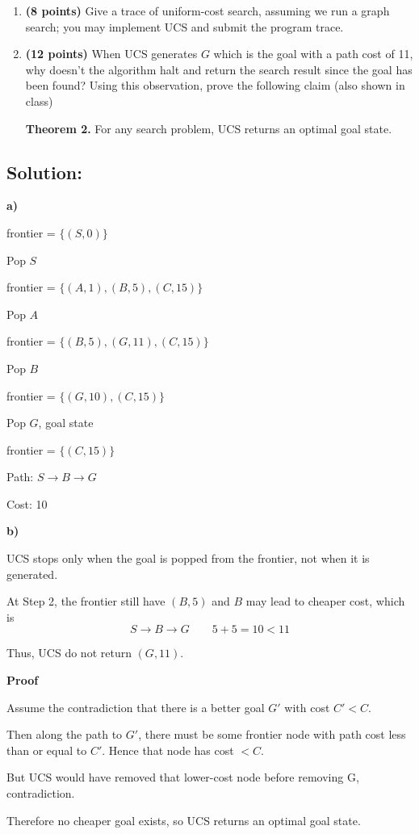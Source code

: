\documentclass[11pt]{article}
\begin{document}
\begin{enumerate}[leftmargin=*, label=\textbf{\arabic*.}]
\begin{enumerate}[label=(\alph*), leftmargin=2em]
    \item \textbf{(8 points)} Give a trace of uniform-cost search, assuming we run a graph search; you may implement UCS and submit the program trace.
    \item \textbf{(12 points)} When UCS generates $G$ which is the goal with a path cost of 11, why doesn't the algorithm halt and return the search result since the goal has been found? Using this observation, prove the following claim (also shown in class)

    \textbf{Theorem 2.} For any search problem, UCS returns an optimal goal state.
\end{enumerate}

\end{enumerate}

\subsection*{Solution:}

\textbf{a)}


frontier = $\{(S, 0)\}$


Pop $S$

frontier = $\{(A, 1), (B, 5), (C, 15)\}$


Pop $A$

frontier = $\{(B, 5), (G, 11), (C, 15)\}$


Pop $B$

frontier = $\{(G, 10), (C, 15)\}$


Pop $G$, goal state

frontier = $\{(C, 15)\}$


Path: $S \rightarrow B \rightarrow G$

Cost: 10

\textbf{b)}

UCS stops only when the goal is popped from the frontier, not when it is generated.

At Step 2, the frontier still have $(B, 5)$ and $B$ may lead to cheaper cost, which is 
\[S \rightarrow B \rightarrow G \qquad 5 + 5 = 10 < 11\]

Thus, UCS do not return $(G, 11)$.

\textbf{Proof}

Assume the contradiction that there is a better goal $G'$ with cost $C' < C$.

Then along the path to $G'$, there must be some frontier node with path cost less than or equal to $C'$. Hence that node has cost $< C$.

But UCS would have removed that lower-cost node before removing G, contradiction.

Therefore no cheaper goal exists, so UCS returns an optimal goal state.
\end{document}
